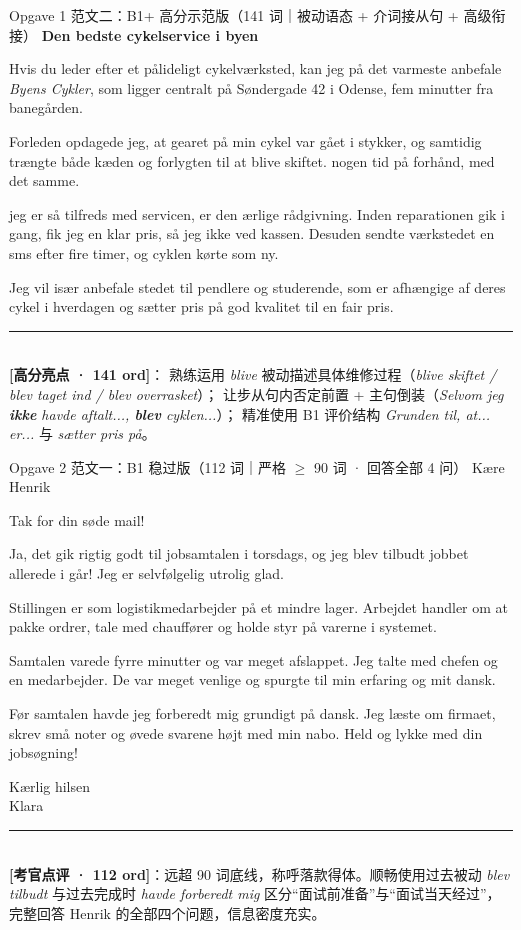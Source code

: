 \begin{emailbox}{Opgave 1 范文二：B1+ 高分示范版（141 词｜被动语态 + 介词接从句 + 高级衔接）}
\textbf{Den bedste cykelservice i byen}

Hvis du leder efter et pålideligt cykelværksted, kan jeg på det varmeste anbefale \textit{Byens Cykler}, som ligger centralt på Søndergade 42 i Odense, fem minutter fra banegården.

Forleden opdagede jeg, at gearet på min cykel var gået i stykker, og samtidig trængte både kæden og forlygten til at blive skiftet.  nogen tid på forhånd,  med det samme.

 jeg er så tilfreds med servicen, er den ærlige rådgivning. Inden reparationen gik i gang, fik jeg en klar pris, så jeg ikke  ved kassen. Desuden sendte værkstedet en sms efter fire timer, og cyklen kørte som ny.

Jeg vil især anbefale stedet til pendlere og studerende, som er afhængige af deres cykel i hverdagen og sætter pris på god kvalitet til en fair pris.

\vspace{0.3em}
\rule{\linewidth}{0.4pt}\\[0.2em]
\small\textbf{\color{NCDNavy}[高分亮点 · 141 ord]}： 熟练运用 \textit{blive} 被动描述具体维修过程（\textit{blive skiftet / blev taget ind / blev overrasket}）； 让步从句内否定前置 + 主句倒装（\textit{Selvom jeg \textbf{ikke} havde aftalt..., \textbf{blev} cyklen...}）； 精准使用 B1 评价结构 \textit{Grunden til, at... er...} 与 \textit{sætter pris på}。
\end{emailbox}

\begin{emailbox}{Opgave 2 范文一：B1 稳过版（112 词｜严格 $\ge$ 90 词 · 回答全部 4 问）}
Kære Henrik

Tak for din søde mail!

Ja, det gik rigtig godt til jobsamtalen i torsdags, og jeg blev tilbudt jobbet allerede i går! Jeg er selvfølgelig utrolig glad.

Stillingen er som logistikmedarbejder på et mindre lager. Arbejdet handler om at pakke ordrer, tale med chauffører og holde styr på varerne i systemet.

Samtalen varede fyrre minutter og var meget afslappet. Jeg talte med chefen og en medarbejder. De var meget venlige og spurgte til min erfaring og mit dansk.

Før samtalen havde jeg forberedt mig grundigt på dansk. Jeg læste om firmaet, skrev små noter og øvede svarene højt med min nabo. Held og lykke med din jobsøgning!

Kærlig hilsen\\
Klara

\vspace{0.3em}
\rule{\linewidth}{0.4pt}\\[0.2em]
\small\textbf{\color{NCDTeal}[考官点评 · 112 ord]}：远超 90 词底线，称呼落款得体。顺畅使用过去被动 \textit{blev tilbudt} 与过去完成时 \textit{havde forberedt mig} 区分“面试前准备”与“面试当天经过”，完整回答 Henrik 的全部四个问题，信息密度充实。
\end{emailbox}


